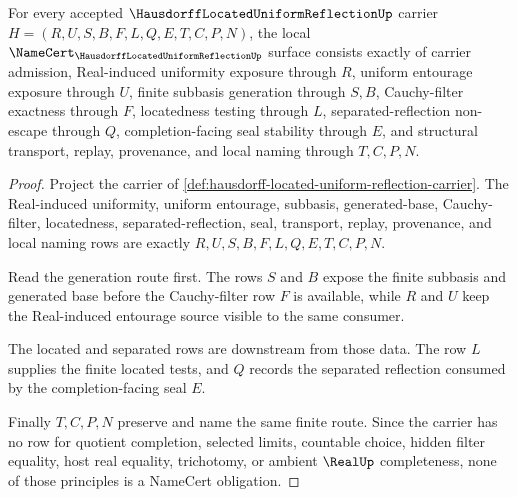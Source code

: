 \begin{theorem}
\label{thm:hausdorff-located-uniform-reflection-namecert-obligations}
For every accepted $\HausdorffLocatedUniformReflectionUp$ carrier $H=(R,U,S,B,F,L,Q,E,T,C,P,N)$, the local $\NameCert_{\HausdorffLocatedUniformReflectionUp}$ surface consists exactly of carrier admission, Real-induced uniformity exposure through $R$, uniform entourage exposure through $U$, finite subbasis generation through $S,B$, Cauchy-filter exactness through $F$, locatedness testing through $L$, separated-reflection non-escape through $Q$, completion-facing seal stability through $E$, and structural transport, replay, provenance, and local naming through $T,C,P,N$.
\end{theorem}
\begin{proof}
Project the carrier of \autoref{def:hausdorff-located-uniform-reflection-carrier}. The Real-induced uniformity, uniform entourage, subbasis, generated-base, Cauchy-filter, locatedness, separated-reflection, seal, transport, replay, provenance, and local naming rows are exactly $R,U,S,B,F,L,Q,E,T,C,P,N$.

Read the generation route first. The rows $S$ and $B$ expose the finite subbasis and generated base before the Cauchy-filter row $F$ is available, while $R$ and $U$ keep the Real-induced entourage source visible to the same consumer.

The located and separated rows are downstream from those data. The row $L$ supplies the finite located tests, and $Q$ records the separated reflection consumed by the completion-facing seal $E$.

Finally $T,C,P,N$ preserve and name the same finite route. Since the carrier has no row for quotient completion, selected limits, countable choice, hidden filter equality, host real equality, trichotomy, or ambient $\RealUp$ completeness, none of those principles is a NameCert obligation.
\end{proof}

